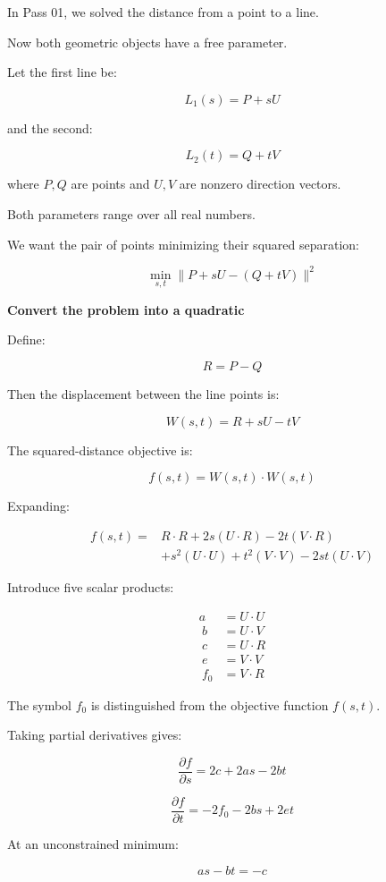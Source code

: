 In Pass 01, we solved the distance from a point to a line.

Now both geometric objects have a free parameter.

Let the first line be:

\[
L_1(s)=P+sU
\]

and the second:

\[
L_2(t)=Q+tV
\]

where \(P,Q\) are points and \(U,V\) are nonzero direction vectors.

Both parameters range over all real numbers.

We want the pair of points minimizing their squared separation:

\[
\boxed{ \min_{s,t}\|P+sU-(Q+tV)\|^2 }
\]

\textbf{Convert the problem into a quadratic}

Define:

\[
R=P-Q
\]

Then the displacement between the line points is:

\[
W(s,t)=R+sU-tV
\]

The squared-distance objective is:

\[
f(s,t)=W(s,t)\cdot W(s,t)
\]

Expanding:

\[
\begin{aligned} f(s,t) ={}&R\cdot R+2s(U\cdot R)-2t(V\cdot R)\\\ &+s^2(U\cdot U)+t^2(V\cdot V)-2st(U\cdot V) \end{aligned}
\]

Introduce five scalar products:

\[
\begin{aligned} a&=U\cdot U\\\ b&=U\cdot V\\\ c&=U\cdot R\\\ e&=V\cdot V\\\ f_0&=V\cdot R \end{aligned}
\]

The symbol \(f_0\) is distinguished from the objective function \(f(s,t)\).

Taking partial derivatives gives:

\[
\frac{\partial f}{\partial s} = 2c+2as-2bt
\]

\[
\frac{\partial f}{\partial t} = -2f_0-2bs+2et
\]

At an unconstrained minimum:

\[
as-bt=-c
\]

